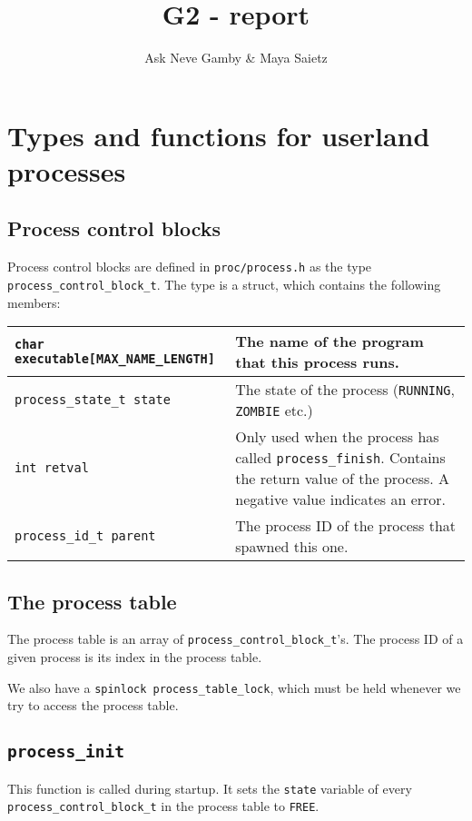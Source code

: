 \documentclass{article}
\title{G2 - report}
\author{Ask Neve Gamby \& Maya Saietz}
\begin{document}
\maketitle
\section{Types and functions for userland processes}

\subsection{Process control blocks}
Process control blocks are defined in \texttt{proc/process.h} as the type \texttt{process\_control\_block\_t}. The type is a struct, which contains the following members:

\begin{tabular}{|p{6cm}|p{6cm}|}
    \hline
    \texttt{char executable[MAX\_NAME\_LENGTH]} & The name of the program that this process runs. \\\hline
               \texttt{process\_state\_t state} & The state of the process (\texttt{RUNNING}, \texttt{ZOMBIE} etc.) \\\hline
                            \texttt{int retval} & Only used when the process has called \texttt{process\_finish}. Contains the return value of the process. A negative value indicates an error. \\\hline
                 \texttt{process\_id\_t parent} & The process ID of the process that spawned this one. \\\hline
\end{tabular}

\subsection{The process table}
The process table is an array of \texttt{process\_control\_block\_t}'s. The process ID of a given process is its index in the process table.

We also have a \texttt{spinlock process\_table\_lock}, which must be held whenever we try to access the process table.

\subsection{\texttt{process\_init}}
This function is called during startup. It sets the \texttt{state} variable of every \texttt{process\_control\_block\_t} in the process table to \texttt{FREE}.
\end{document}
